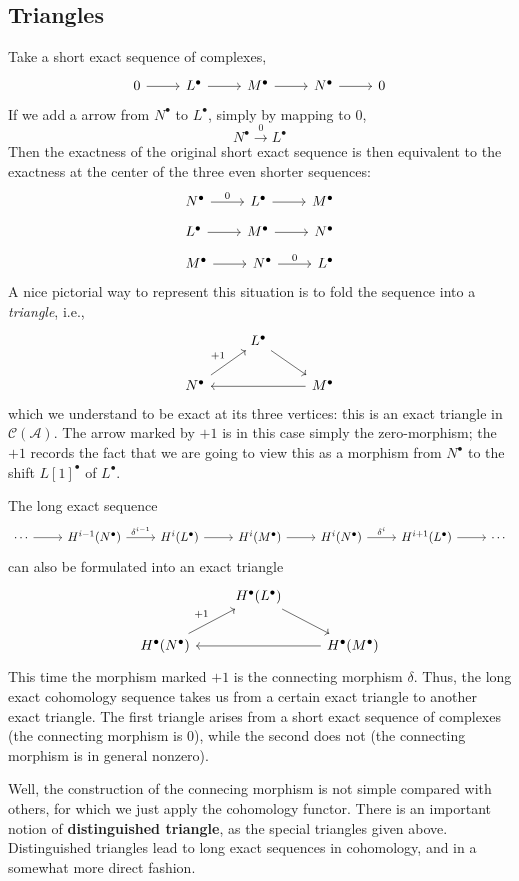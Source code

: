 \subsection{Triangles}
Take a short exact sequence of complexes,
\[\begin{tikzcd}
0\ar[r]&L^\bullet\ar[r]&M^\bullet\ar[r]&N^\bullet\ar[r]&0
\end{tikzcd}\]
If we add a arrow from $N^\bullet$ to $L^\bullet$, simply by mapping to $0$,
\[N^\bullet\stackrel{0}{\to}L^\bullet\]
Then the exactness of the original short exact sequence is then equivalent to the exactness
at the center of the three even shorter sequences:
\[\begin{tikzcd}
N^\bullet\ar[r,"0"]&L^\bullet\ar[r]&M^\bullet
\end{tikzcd}\]
\[\begin{tikzcd}
L^\bullet\ar[r]&M^\bullet\ar[r]&N^\bullet
\end{tikzcd}\]
\[\begin{tikzcd}
M^\bullet\ar[r]&N^\bullet\ar[r,"0"]&L^\bullet
\end{tikzcd}\]
A nice pictorial way to represent this situation is to fold the sequence into a \textit{triangle}, i.e.,
\[\begin{tikzcd}
&L^\bullet\ar[dr]&\\
N^\bullet\ar[ru,"+1"]&&M^\bullet\ar[ll]
\end{tikzcd}\]
which we understand to be exact at its three vertices: this is an exact triangle
in $\mathcal{C}(\mathcal{A})$. The arrow marked by $+1$ is in this case simply the zero-morphism; the $+1$ records the fact that we are going to view this as a 
morphism from $N^\bullet$ to the shift $L[1]^\bullet$ of $L^\bullet$.\par
The long exact sequence
\[\begin{tikzcd}[scale=0.9]
\cdots\ar[r]&H^{i-1}(N^\bullet)\ar[r,"\delta^{i-1}"]&H^i(L^\bullet)\ar[r]&H^i(M^\bullet)\ar[r]&H^i(N^\bullet)\ar[r,"\delta^i"]&H^{i+1}(L^\bullet)\ar[r]&\cdots
\end{tikzcd}\]
can also be formulated into an exact triangle
\[\begin{tikzcd}
&H^\bullet(L^\bullet)\ar[dr]&\\
H^\bullet(N^\bullet)\ar[ru,"+1"]&&H^\bullet(M^\bullet)\ar[ll]
\end{tikzcd}\]
This time the morphism marked $+1$ is the connecting morphism $\delta$. Thus, the long exact cohomology sequence takes us from a certain exact triangle to another exact triangle. The first triangle arises from a short exact sequence of complexes (the connecting morphism is $0$), while the second does not (the connecting morphism is in general nonzero).\par
Well, the construction of the connecing morphism is not simple compared with others, for which we just apply the cohomology functor. There is an important notion of \textbf{distinguished triangle}, as the special triangles given above. Distinguished triangles lead to long exact sequences in cohomology, and in a somewhat more direct fashion.
